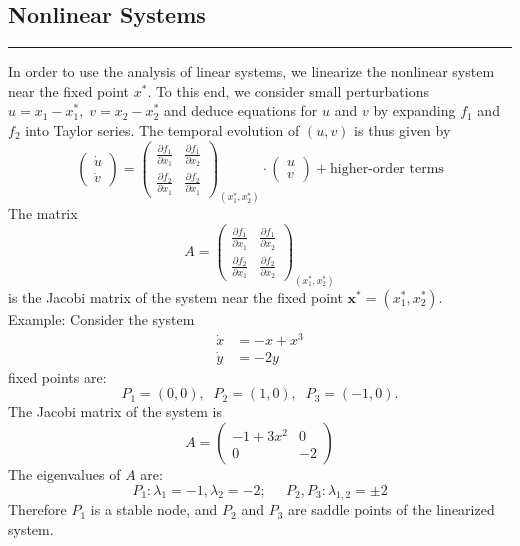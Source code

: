\subsection{Nonlinear Systems}
\noindent\rule[\linienAbstand]{\linewidth}{\linienDicke}
In order to use the analysis of linear systems, we linearize the nonlinear system near the fixed point $x^*$. To this end, we consider small perturbations $u = x_1 - x^*_1, \; v = x_2 - x^*_2$ and deduce equations for $u$ and $v$ by expanding $f_1$ and $f_2$ into Taylor series. The temporal evolution of $(u, v)$ is thus given by
\begin{equation}
  \begin{pmatrix} \dot{u} \\ \dot{v} \end{pmatrix} =
  \begin{pmatrix} \frac{\partial f_1}{\partial x_1} & \frac{\partial f_1}{\partial x_2}\\
                  \frac{\partial f_2}{\partial x_1} & \frac{\partial f_2}{\partial x_1}
  \end{pmatrix}_{(x_1^*, x_2^*)} \cdot
  \begin{pmatrix} u \\ v \end{pmatrix} + \text{higher-order terms}
\end{equation}
The matrix
\begin{equation}
  A =   \begin{pmatrix} \frac{\partial f_1}{\partial x_1} & \frac{\partial f_1}{\partial x_2}\\
                        \frac{\partial f_2}{\partial x_1} & \frac{\partial f_2}{\partial x_2}
        \end{pmatrix}_{(x_1^*, x_2^*)}
\end{equation}
is the Jacobi matrix of the system near the fixed point $\textbf{x}^* = (x_1^*, x_2^*)$.\\

Example: Consider the system
\begin{equation}
  \begin{split}
    \dot{x} &= -x + x^3\\
    \dot{y} &= -2y
  \end{split}
\end{equation}
fixed points are:
\begin{equation}
  P_1 = (0, 0), \;\; P_2 = (1, 0), \;\; P_3 = (-1, 0).
\end{equation}
The Jacobi matrix of the system is
\begin{equation}
  A = \begin{pmatrix}
      -1+3x^2 & 0 \\
      0 & -2
  \end{pmatrix}
\end{equation}
The eigenvalues of $A$ are:
\begin{equation}
  P_1: \lambda_1 = -1, \lambda_2 = -2; \;\;\;\;\; P_2, P_3: \lambda_{1,2} = \pm 2
\end{equation}
Therefore $P_1$ is a stable node, and $P_2$ and $P_3$ are saddle points of the linearized system.\\

